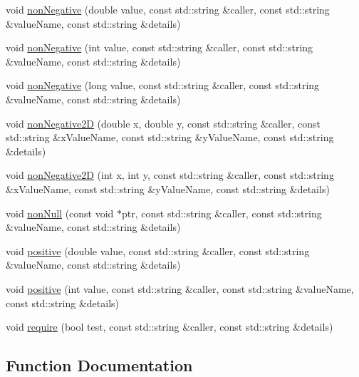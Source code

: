 \begin{DoxyCompactItemize}
\item 
void \mbox{\hyperlink{namespacerequire_a1ea7fb60c9f1e4facc46b4fba5e0a924}{non\+Negative}} (double value, const std\+::string \&caller, const std\+::string \&value\+Name, const std\+::string \&details)
\item 
void \mbox{\hyperlink{namespacerequire_a40cad20a5826d829aaf4083c27175b05}{non\+Negative}} (int value, const std\+::string \&caller, const std\+::string \&value\+Name, const std\+::string \&details)
\item 
void \mbox{\hyperlink{namespacerequire_ab6ae8c9103d53e949d404cd5a183fca5}{non\+Negative}} (long value, const std\+::string \&caller, const std\+::string \&value\+Name, const std\+::string \&details)
\item 
void \mbox{\hyperlink{namespacerequire_a2214293651f178b5b1f1a286537328bf}{non\+Negative2D}} (double x, double y, const std\+::string \&caller, const std\+::string \&x\+Value\+Name, const std\+::string \&y\+Value\+Name, const std\+::string \&details)
\item 
void \mbox{\hyperlink{namespacerequire_ad0791f9f281c785969854c26f3506ac4}{non\+Negative2D}} (int x, int y, const std\+::string \&caller, const std\+::string \&x\+Value\+Name, const std\+::string \&y\+Value\+Name, const std\+::string \&details)
\item 
void \mbox{\hyperlink{namespacerequire_a3be177878a4f956f7130efa7fe161309}{non\+Null}} (const void $\ast$ptr, const std\+::string \&caller, const std\+::string \&value\+Name, const std\+::string \&details)
\item 
void \mbox{\hyperlink{namespacerequire_a332040c87f61ff35778acdf5ad074d57}{positive}} (double value, const std\+::string \&caller, const std\+::string \&value\+Name, const std\+::string \&details)
\item 
void \mbox{\hyperlink{namespacerequire_a64d94146fb46d01da7e8eb081c76562d}{positive}} (int value, const std\+::string \&caller, const std\+::string \&value\+Name, const std\+::string \&details)
\item 
void \mbox{\hyperlink{namespacerequire_a31784ceeaf8596385d87a754c2bf3aba}{require}} (bool test, const std\+::string \&caller, const std\+::string \&details)
\end{DoxyCompactItemize}


\subsection{Function Documentation}
\mbox{\label{namespacerequire_ad78e30d90d1c87a2b922f89edabbef38}} 
